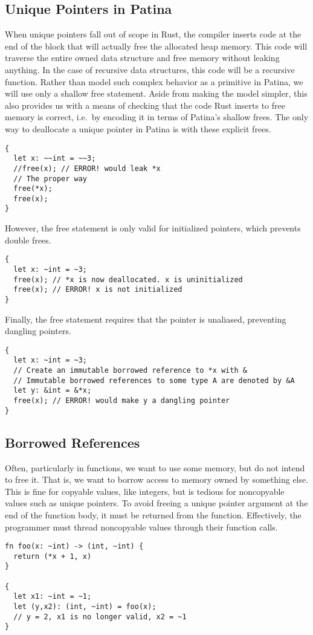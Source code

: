 \subsection*{Unique Pointers in Patina}
When unique pointers fall out of scope in Rust, the compiler inserts code at the end
of the block that will actually free the allocated heap memory. This code will
traverse the entire owned data structure and free memory without leaking anything.
In the case of recursive data structures, this code will be a recursive function.
Rather than model such complex behavior as a primitive in Patina, we will use only
a shallow free statement. Aside from making the model simpler, this also provides us
with a means of checking that the code Rust inserts to free memory is correct,
i.e.\ by encoding it in terms of Patina's shallow frees.
The only way to deallocate a unique pointer in Patina is with these explicit frees.
\begin{verbatim}
{
  let x: ~~int = ~~3;
  //free(x); // ERROR! would leak *x
  // The proper way
  free(*x);
  free(x);
}
\end{verbatim}
However, the free statement is only valid for initialized pointers, which prevents double frees.
\begin{verbatim}
{
  let x: ~int = ~3;
  free(x); // *x is now deallocated. x is uninitialized
  free(x); // ERROR! x is not initialized
}
\end{verbatim}
Finally, the free statement requires that the pointer is unaliased, preventing dangling pointers.
\begin{verbatim}
{
  let x: ~int = ~3;
  // Create an immutable borrowed reference to *x with &
  // Immutable borrowed references to some type A are denoted by &A
  let y: &int = &*x;
  free(x); // ERROR! would make y a dangling pointer
}
\end{verbatim}

\subsection*{Borrowed References}
Often, particularly in functions, we want to use some memory, but do not intend to free it.
That is, we want to borrow access to memory owned by something else.
This is fine for copyable values, like integers, 
but is tedious for noncopyable values such as unique pointers.
To avoid freeing a unique pointer argument at the end of the function body,
it must be returned from the function.
Effectively, the programmer must thread noncopyable values through their function calls.
\begin{verbatim}
fn foo(x: ~int) -> (int, ~int) {
  return (*x + 1, x)
}

{
  let x1: ~int = ~1;
  let (y,x2): (int, ~int) = foo(x);
  // y = 2, x1 is no longer valid, x2 = ~1
}
\end{verbatim}

